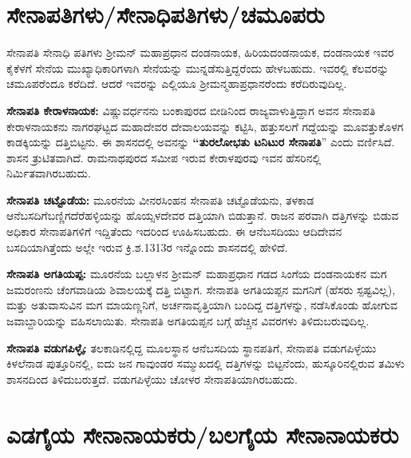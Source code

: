 \section{ಸೇನಾಪತಿಗಳು/ಸೇನಾಧಿಪತಿಗಳು/ಚಮೂಪರು}

ಸೇನಾಪತಿ ಸೇನಾಧಿ ಪತಿಗಳು ಶ‍್ರೀಮನ್​ ಮಹಾಪ್ರಧಾನ ದಂಡನಾಯಕ, ಹಿರಿಯದಂಡನಾಯಕ, ದಂಡನಾಯಕ ಇವರ ಕೈಕೆಳಗೆ ಸೇನೆಯ ಮುಖ್ಯಾಧಿಕಾರಿಗಳಾಗಿ ಸೇನೆಯನ್ನು ಮುನ್ನಡೆಸುತ್ತಿದ್ದರೆಂದು ಹೇಳಬಹುದು. ಇವರಲ್ಲಿ ಕೆಲವರನ್ನು ಚಮೂಪರೆಂದೂ ಕರೆದಿದೆ. ಆದರೆ ಇವರನ್ನು ಎಲ್ಲಿಯೂ ಶ‍್ರೀಮನ್ಮಹಾಪ್ರಧಾನರೆಂದು ಕರೆದಿರುವುದಿಲ್ಲ.

\vskip 4pt

\textbf{ಸೇನಾಪತಿ ಕೇರಾಳನಾಯಕ:} ವಿಷ್ಣುವರ್ಧನನು ಬಂಕಾಪುರದ ಬೀಡಿನಿಂದ ರಾಜ್ಯವಾಳುತ್ತಿದ್ದಾಗ ಅವನ ಸೇನಾಪತಿ ಕೇರಾಳನಾಯಕನು ನಾಗರಘಟ್ಟದ ಮಹಾದೇವರ ದೇವಾಲಯವನ್ನು ಕಟ್ಟಿಸಿ, ಹತ್ತುಸಲಗೆ ಗದ್ದೆಯನ್ನು ಮೂವತ್ತುಕೊಳಗ ಕಾಡಕ್ಕಿಯನ್ನು ದತ್ತಿಬಿಟ್ಟನು. ಈ ಶಾಸನದಲ್ಲಿ ಅವನನ್ನು \textbf{“ತುರಲೋಭತು ಟನಿಟುರ ಸೇನಾಪತಿ}” ಎಂದು ವರ್ಣಿಸಿದೆ. ಶಾಸನ ತ್ರುಟಿತವಾಗಿದೆ. ರಾಮನಾಥಪುರದ ಸಮೀಪ ಇರುವ ಕೇರಾಳಪುರವು ಇವನ ಹೆಸರಿನಲ್ಲಿ ನಿರ್ಮಿತವಾಗಿರಬಹುದು.

\vskip 2pt

\textbf{ಸೇನಾಪತಿ ಚಟ್ಟೊಡೆಯ:} ಮೂರನೆಯ ವೀನರಸಿಂಹನ ಸೇನಾಪತಿ ಚಟ್ಟೊಡೆಯನು, ತಳಕಾಡ ಆನೆಬಸದಿಗೆ\break ಬಣ್ಣಿಗದೆರೆಹಳ್ಳಿಯನ್ನು ಹೊಯ್ಸಳದೇವರ ದತ್ತಿಯಾಗಿ ಬಿಡುತ್ತಾನೆ. ರಾಜನ ಪರವಾಗಿ ದತ್ತಿಗಳನ್ನು ಬಿಡುವ ಅಧಿಕಾರ ಸೇನಾಪತಿಗಳಿಗೆ ಇದ್ದಿತೆಂದು ಇದರಿಂದ ಊಹಿಸಬಹುದು. ಈ ಆನೆಬಸದಿಯು ಆದಿದೇವನ ಬಸದಿಯಾಗಿತ್ತೆಂದು ಅಲ್ಲೇ ಇರುವ ಕ್ರಿ.ಶ.1313ರ ಇನ್ನೊಂದು ಶಾಸನದಲ್ಲಿ ಹೇಳಿದೆ.

\vskip 2pt

\textbf{ಸೇನಾಪತಿ ಅಗತಿಯಪ್ಪ:} ಮೂರನೆಯ ಬಲ್ಲಾಳನ ಶ‍್ರೀಮನ್​ ಮಹಾಪ್ರಧಾನ ಗಡದ ಸಿಂಗೆಯ ದಂಡನಾಯಕನ ಮಗ ಜಮರಂಣನು ಚೆಂಗವಾಡಿಯ ಶಿವಾಲಯಕ್ಕೆ ದತ್ತಿ ಬಿಟ್ಟಾಗ. ಸೇನಾಪತಿ ಅಗತಿಯಪ್ಪನ ಮಗನಿಗೆ (ಹೆಸರು ಸ್ಪಷ್ಟವಿಲ್ಲ), ಮತ್ತು ಅತುವಾಸುವಿನ ಮಗ ಮಾಯಣ್ಣನಿಗೆ, ಅರ್ಚನಾವೃತ್ತಿಯಾಗಿ ಬಂದಿದ್ದ ದತ್ತಿಗಳನ್ನು, ನಡೆಸಿಕೊಂಡು ಹೋಗುವ ಜವಾಬ್ದಾರಿಯನ್ನು ವಹಿಸಲಾಯಿತು. ಸೇನಾಪತಿ ಅಗತಿಯಪ್ಪನ ಬಗ್ಗೆ ಹೆಚ್ಚಿನ ವಿವರಗಳು ತಿಳಿದುಬರುವುದಿಲ್ಲ.

\vskip 2pt

\textbf{ಸೇನಾಪತಿ ವಡುಗಪಿಳ್ಳೈ:} ತಲಕಾಡಿನಲ್ಲಿದ್ದ ಮೂಲಸ್ಥಾನ ಆನೆಬಸದಿಯ ಸ್ಥಾನಪತಿಗೆ, ಸೇನಾಪತಿ ವಡುಗಪಿಳ್ಳೆಯು ಕಿಳಲೆನಾಡ ಪುತ್ತೂರಿನಲ್ಲಿ, ಐದು ಜನ ಗಾವುಂಡರ ಸಮ್ಮುಖದಲ್ಲಿ ದತ್ತಿಗಳನ್ನು ಬಿಟ್ಟನೆಂದು, ಹುಸ್ಕೂರಿನಲ್ಲಿರುವ ತಮಿಳು ಶಾಸನದಿಂದ ತಿಳಿದುಬರುತ್ತದೆ. ವಡುಗಪಿಳ್ಳೆಯು ಚೋಳರ ಸೇನಾಪತಿಯಾಗಿರಬಹುದು.


\section{ಎಡಗೈಯ ಸೇನಾನಾಯಕರು/ಬಲಗೈಯ ಸೇನಾನಾಯಕರು}

